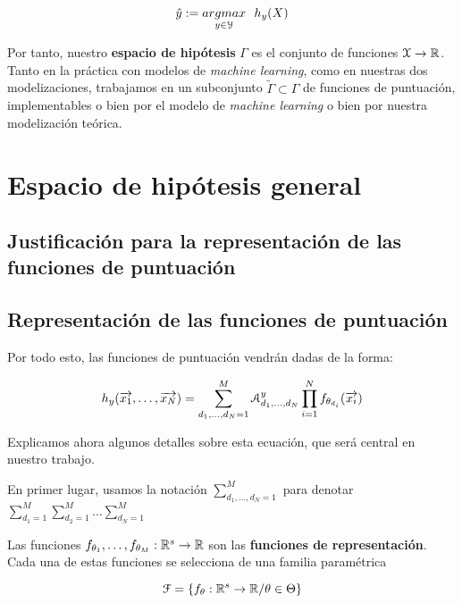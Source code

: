 $$\hat{y} := \underset{y \in \mathcal{Y}}{argmax} \ \  h_y(X)$$

Por tanto, nuestro \textbf{espacio de hipótesis} $\Gamma$ es el conjunto de funciones $\mathcal{X} \to \mathbb{R}$. Tanto en la práctica con modelos de \textit{machine learning}, como en nuestras dos modelizaciones, trabajamos en un subconjunto $\tilde{\Gamma} \subset \Gamma$ de funciones de puntuación, implementables o bien por el modelo de \textit{machine learning} o bien por nuestra modelización teórica.

\section{Espacio de hipótesis general}

\subsection{Justificación para la representación de las funciones de puntuación} \label{sec:justificacion_func_repr}


\subsection{Representación de las funciones de puntuación} \label{sec:repr_funciones_puntuacion}

Por todo esto, las funciones de puntuación vendrán dadas de la forma:

\begin{equation} \label{eq:puntuacion_general}
    h_y(\overrightarrow{x_1}, \ldots, \overrightarrow{x_N}) = \sum_{d_1, \ldots, d_N = 1}^{M} \mathcal{A}^y_{d_1, \ldots, d_N} \prod_{i = 1}^N f_{\theta_{d_i}}(\overrightarrow{x_i})
\end{equation}

Explicamos ahora algunos detalles sobre esta ecuación, que será central en nuestro trabajo.

En primer lugar, usamos la notación $\sum_{d_1, \ldots, d_N = 1}^{M}$ para denotar $\sum_{d_1 = 1}^{M} \sum_{d_2 = 1}^{M} \ldots \sum_{d_N = 1}^{M}$

Las funciones $f_{\theta_1}, \ldots, f_{\theta_M}: \mathbb{R}^s \to \mathbb{R}$ son las \textbf{funciones de representación}. Cada una de estas funciones se selecciona de una familia paramétrica

$$\mathcal{F} = \{ f_{\theta}: \mathbb{R}^s \to \mathbb{R} / \theta \in \Theta \}$$

